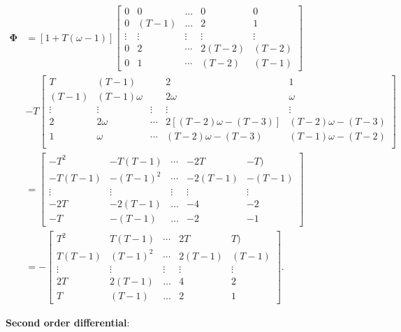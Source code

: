 \documentclass[12pt,a4paper,hyperref]{article}
\begin{document}
\begin{align*}
\boldsymbol{\Phi} & =[1+T(\omega-1)]
\begin{bmatrix}
 0  & 0 & \ldots & 0 & 0    \\
 0 & (T-1) & \ldots & 2 &    1 \\
  \vdots & \vdots & \vdots & \vdots & \vdots    \\
 0  & 2 & \cdots & 2(T-2) &  (T-2)   \\
 0   & 1 & \cdots & (T-2) & (T-1)
\end{bmatrix} \\
& -T
\begin{bmatrix}
 T & (T-1) &  & 2 & 1   \\
 (T-1) & (T-1)\omega &  & 2\omega &  \omega  \\
  \vdots & \vdots & \vdots & \vdots &  \vdots  \\
   2 & 2\omega  & \cdots & 2[(T-2)\omega-(T-3)] &  (T-2)\omega-(T-3)  \\
   1 & \omega  & \cdots & (T-2)\omega-(T-3) &  (T-1)\omega-(T-2)  \\
\end{bmatrix} \\
& =
\begin{bmatrix}
  -T^{2}    & -T(T-1)    & \cdots & -2T    &  -T) \\
  -T(T-1)    & -(T-1)^{2}    & \cdots & -2(T-1)    & -(T-1) \\
 \vdots  & \vdots & \vdots & \vdots & \vdots \\
 -2T     & -2(T-1)   &  \ldots   & -4  & -2 \\
 -T    & -(T-1)   &    \ldots    & -2  & -1
\end{bmatrix}
\\ & =
 -
\begin{bmatrix}
  T^{2}    & T(T-1)    & \cdots & 2T    &  T) \\
  T(T-1)    & (T-1)^{2}    & \cdots & 2(T-1)    & (T-1) \\
 \vdots  & \vdots & \vdots & \vdots & \vdots \\
 2T     & 2(T-1)   &  \ldots   & 4  & 2 \\
 T    & (T-1)   &    \ldots    & 2  & 1
\end{bmatrix}.
\end{align*}

\textrm{\textbf{Second order differential}}:
\end{document}
